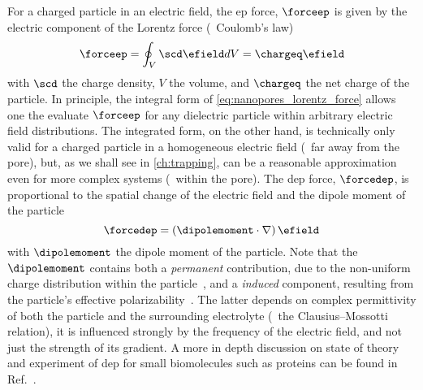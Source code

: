 For a charged particle in an electric field, the \gls{ep} force, $\forceep$ is given by the electric component
of the Lorentz force (\ie~Coulomb's law)~\cite{Lu-2012}
%
\begin{equation}\label{eq:nanopores_lorentz_force}
  \forceep = \oint_{V} \scd \efield dV = \chargeq \efield 
\end{equation}
%
with $\scd$ the charge density, $V$ the volume, and $\chargeq$ the net charge of the particle. In principle,
the integral form of \cref{eq:nanopores_lorentz_force} allows one the evaluate $\forceep$ for any dielectric
particle within arbitrary electric field distributions. The integrated form, on the other hand, is technically
only valid for a charged particle in a homogeneous electric field (\ie~far away from the pore), but, as we
shall see in \cref{ch:trapping}, can be a reasonable approximation even for more complex systems (\eg~within
the pore). The \gls{dep} force, $\forcedep$, is proportional to the spatial change of the electric field and
the dipole moment of the particle~\cite{Hoelzel-2020}
%
\begin{equation}\label{eq:nanopores_dep_force}
  \forcedep = \left( \dipolemoment \cdot \nabla \right) \efield 
\end{equation}
%
with $\dipolemoment$ the dipole moment of the particle. Note that the $\dipolemoment$ contains both a
\emph{permanent} contribution, due to the non-uniform charge distribution within the
particle~\cite{Hoelzel-2020,VanMeervelt-2017}, and a \emph{induced} component, resulting from the particle's
effective polarizability~\cite{Minerick-2015}. The latter depends on complex permittivity of both the particle
and the surrounding electrolyte (\ie~the Clausius--Mossotti relation), it is influenced strongly by the
frequency of the electric field, and not just the strength of its gradient. A more in depth discussion on
state of theory and experiment of \gls{dep} for small biomolecules such as proteins can be found in
Ref.~\cite{Hoelzel-2020}.

